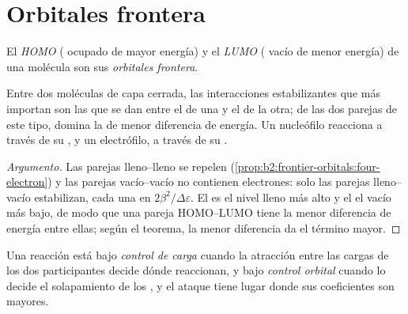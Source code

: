 \section{Orbitales frontera}

\begin{definition}\label{def:b2:frontier-orbitals:frontier}
El \emph{HOMO} ( ocupado de mayor energía) y el
\emph{LUMO} ( vacío de menor energía) de una molécula son sus
\emph{orbitales frontera}.
\end{definition}

\begin{proposition}\label{prop:b2:frontier-orbitals:dominant}
Entre dos moléculas de capa cerrada, las interacciones estabilizantes que más importan
son las que se dan entre el  de una y el  de la otra; de las dos parejas de este tipo, domina
la de menor diferencia de energía. Un nucleófilo reacciona a través de su , y un
electrófilo, a través de su .
\end{proposition}

\begin{proof}[Argumento]
Las parejas lleno--lleno se repelen (\cref{prop:b2:frontier-orbitals:four-electron}) y las parejas vacío--vacío
no contienen electrones: solo las parejas lleno--vacío estabilizan, cada una en $2\beta^2/\Delta\varepsilon$.
El  es el nivel lleno más alto y el  el vacío más bajo, de modo que una
pareja HOMO--LUMO tiene la menor diferencia de energía entre ellas; según el teorema, la menor diferencia
da el término mayor.
\end{proof}

\begin{definition}\label{def:b2:frontier-orbitals:control}
Una reacción está bajo \emph{control de carga} cuando la atracción
entre las cargas de los dos participantes decide dónde reaccionan, y bajo
\emph{control orbital} cuando lo decide el solapamiento de los ,
y el ataque tiene lugar donde sus coeficientes son mayores.
\end{definition}

